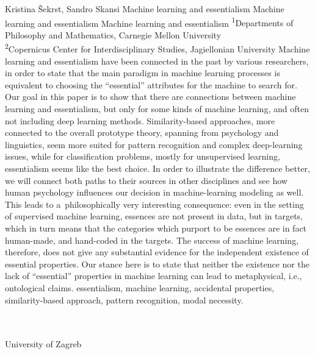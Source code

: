\begin{artengenv2auth}{Kristina Šekrst, Sandro Skansi}
	{Machine learning and essentialism}
	{Machine learning and essentialism}
	{Machine learning and essentialism}
	{\textsuperscript{1}Departments of Philosophy and Mathematics, Carnegie Mellon University\\
		\textsuperscript{2}Copernicus Center for Interdisciplinary Studies, Jagiellonian University}
	{\label{sekrst_start}Machine learning and essentialism have been connected in the past by various researchers, in order to state that the main paradigm in machine learning processes is equivalent to choosing the ``essential'' attributes for the machine to search for. Our goal in this paper is to show that there are connections between machine learning and essentialism, but only for some kinds of machine learning, and often not including deep learning methods. Similarity-based approaches, more connected to the overall prototype theory, spanning from psychology and linguistics, seem more suited for pattern recognition and complex deep-learning issues, while for classification problems, mostly for unsupervised learning, essentialism seems like the best choice. In order to illustrate the difference better, we will connect both paths to their sources in other disciplines and see how human psychology influences our decision in machine-learning modeling as well. This leads to a~philosophically very interesting consequence: even in the setting of supervised machine learning, essences are not present in data, but in targets, which in turn means that the categories which purport to be essences are in fact human-made, and hand-coded in the targets. The success of machine learning, therefore, does not give any substantial evidence for the independent existence of essential properties. Our stance here is to state that neither the existence nor the lack of ``essential'' properties in machine learning can lead to metaphysical, i.e., ontological claims.}
	{essentialism, machine learning, accidental properties, similarity-based approach, pattern recognition, modal necessity.}
	{%
				{\flushright{}\\\\\subsubsectit\small{University of Zagreb}\par}%
	}



\end{artengenv2auth}
